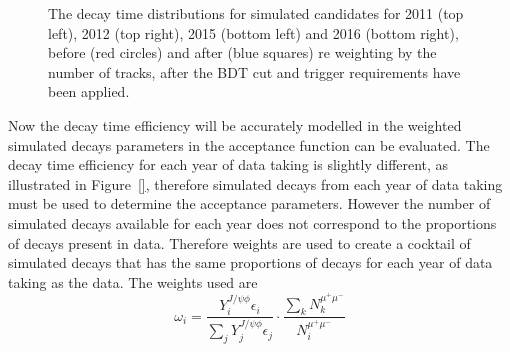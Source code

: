 \begin{figure}[ht]
  \caption{The decay time distributions for \bsmumu simulated candidates for 2011 (top left), 2012 (top right), 2015 (bottom left) and 2016 (bottom right), before (red circles) and after (blue squares) re weighting by the number of tracks, after the BDT cut and trigger requirements have been applied.}
  \label{fig:BsTomumu_weightDecayTime}
\end{figure}


Now the decay time efficiency will be accurately modelled in the weighted simulated \bsmumu decays parameters in the acceptance function can be evaluated. The decay time efficiency for each year of data taking is slightly different, as illustrated in Figure~\ref{}, therefore simulated decays from each year of data taking must be used to determine the acceptance parameters. However the number of simulated decays available for each year does not correspond to the proportions of decays present in data. Therefore weights are used to create a cocktail of simulated decays that has the same proportions of decays for each year of data taking as the data. The weights used are
\begin{equation}
\omega_{i}  = \frac{Y_{i}^{J/\psi \phi} \epsilon_{i}}{\displaystyle\sum_{j} Y_{j}^{J/\psi \phi} \epsilon_{j}} \cdot \frac{\displaystyle\sum_{k} N_{k}^{\mu^{+}\mu^{-}}}{N_{i}^{\mu^{+}\mu^{-}}}
\end{equation}
